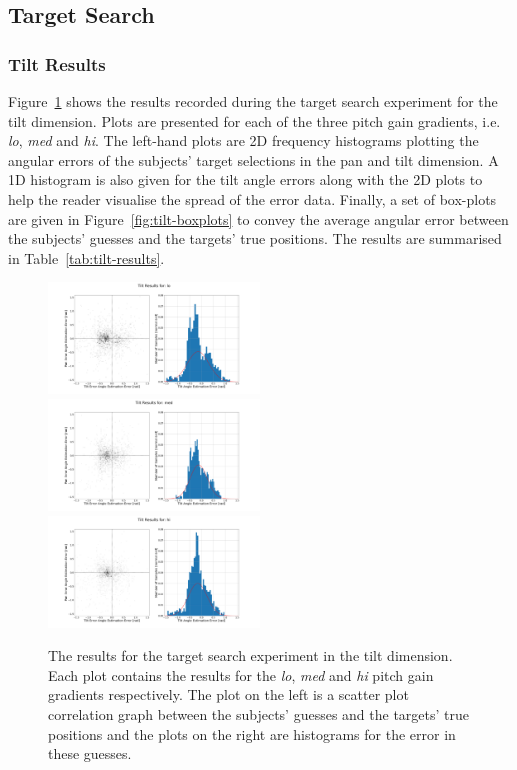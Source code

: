 \documentclass[format=sigconf, review=true, screen=true, anonymous=true]{acmart}
\begin{document}
\subsection{Target Search}

\subsubsection{Tilt Results}

Figure~\ref{fig:err-results} shows the results recorded during the target search experiment for the tilt dimension. Plots are presented for each of the three pitch gain gradients, i.e. \emph{lo}, \emph{med} and \emph{hi}. The left-hand plots are 2D frequency histograms plotting the angular errors of the subjects' target selections in the pan and tilt dimension. A 1D histogram is also given for the tilt angle errors along with the 2D plots to help the reader visualise the spread of the error data. Finally, a set of box-plots are given in Figure~\ref{fig:tilt-boxplots} to convey the average angular error between the subjects' guesses and the targets' true positions. The results are summarised in Table~\ref{tab:tilt-results}.

\begin{figure}
  \centering
  \includegraphics[width=0.5\textwidth]{figures/tilt_err_lo.png}
  \includegraphics[width=0.5\textwidth]{figures/tilt_err_med.png}
  \includegraphics[width=0.5\textwidth]{figures/tilt_err_hi.png}
  \caption{The results for the target search experiment in the tilt dimension. Each plot contains the results for the \emph{lo}, \emph{med} and \emph{hi} pitch gain gradients respectively. The plot on the left is a scatter plot correlation graph between the subjects' guesses and the targets' true positions and the plots on the right are histograms for the error in these guesses. }
  \label{fig:err-results}
\end{figure}
\end{document}

